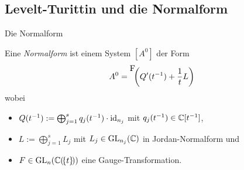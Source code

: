 \subsection{Levelt-Turittin und die Normalform}
\begin{frame}{Die Normalform}
  \begin{defn}
    Eine \emph{Normalform} ist einem System $[A^0]$ der Form
    \[
      A^0= \raisebox{1em}{F} \!\!\left(Q'(t^{-1})+\frac{1}{t}L\right)
    \]
    wobei
    \begin{itemize}
    \item $Q(t^{-1}):=\bigoplus_{j=1}^sq_j(t^{-1})\cdot\operatorname{id}_{n_j}$ mit
      $q_j(t^{-1})\in\mathbb{C}[t^{-1}]$,
    \item $L:=\bigoplus_{j=1}^sL_j$ mit $L_j\in\operatorname{GL}_{n_j}(\mathbb{C})$ in
      Jordan-Normalform und
    \item $F\in\operatorname{GL}_n(\mathbb{C}(\!\{t\}\!))$ eine Gauge-Transformation.
    \end{itemize}
  \end{defn}
\end{frame}

